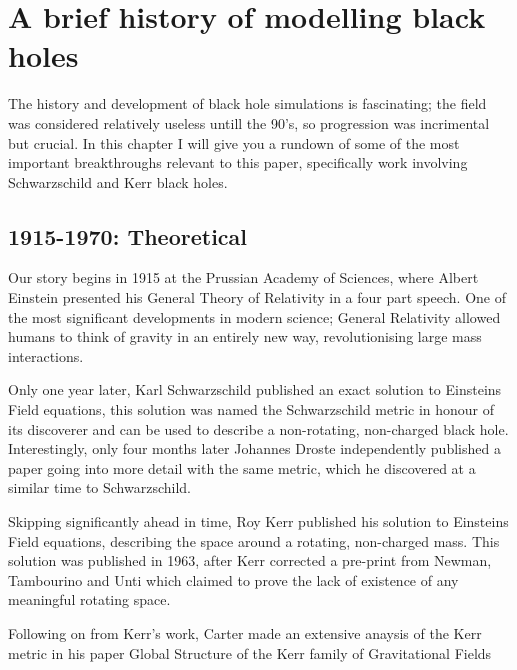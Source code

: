 \documentclass[oneside,openright,frontopenright, singlespacing]{dmathesis}
\begin{document}
\chapter{A brief history of modelling black holes}

	The history and development of black hole simulations is fascinating; the field was considered relatively useless untill the 90's, so progression was incrimental but crucial. In this chapter I will give you a rundown of some of the most important breakthroughs relevant to this paper, specifically work involving Schwarzschild and Kerr black holes.

\section{1915-1970: Theoretical}

	Our story begins in 1915 at the Prussian Academy of Sciences, where Albert Einstein presented his General Theory of Relativity\cite{einstein1915feldgleichungen} in a four part speech. One of the most significant developments in modern science; General Relativity allowed humans to think of gravity in an entirely new way, revolutionising large mass interactions.

\vspace{1em}
	Only one year later, Karl Schwarzschild published an exact solution to Einsteins Field equations\cite{schwarzschild1916gravitationsfeld}, this solution was named the Schwarzschild metric in honour of its discoverer and can be used to describe a non-rotating, non-charged black hole. Interestingly, only four months later Johannes Droste independently published a paper going into more detail with the same metric\cite{droste1917field}, which he discovered at a similar time to Schwarzschild.

\vspace{1em}
	Skipping significantly ahead in time, Roy Kerr published his solution to Einsteins Field equations, describing the space around a rotating, non-charged mass. This solution was published in 1963\cite{kerr1963gravitational}, after Kerr corrected a pre-print from Newman, Tambourino and Unti which claimed to prove the lack of existence of any meaningful rotating space\cite{newman1963empty}.

\vspace{1em}
	Following on from Kerr's work, Carter made an extensive anaysis of the Kerr metric in his paper Global Structure of the Kerr family of Gravitational Fields\cite{carter1968global}
\end{document}
